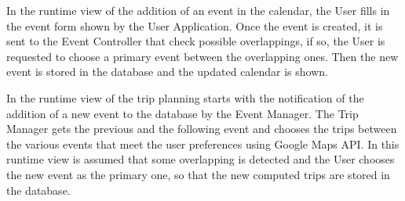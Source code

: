 In the runtime view of the addition of an event in the calendar, the User fills in the event form shown by the User Application. Once the event is created, it is sent to the Event Controller that check possible overlappings, if so, the User is requested to choose a primary event between the overlapping ones. Then the new event is stored in the database and the updated calendar is shown.

\pagebreak
\begin{landscape}
\begin{center}
\thispagestyle{empty}
\end{center}
\end{landscape}

In the runtime view of the trip planning starts with the notification of the addition of a new event to the database by the Event Manager. The Trip Manager gets the previous and the following event and chooses the trips between the various events that meet the user preferences using Google Maps API. In this runtime view is assumed that some overlapping is detected and the User chooses the new event as the primary one, so that the new computed trips are stored in the database.

\pagebreak
\begin{landscape}
\begin{center}
\thispagestyle{empty}
\end{center}
\end{landscape}

